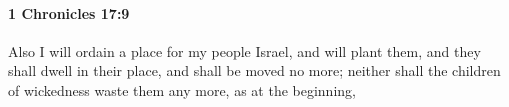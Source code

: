 
		\paragraph{1 Chronicles 17:9} %
			\label{1CHRONICLES-17-9}

			Also I will ordain a place for my people Israel, and will plant them, and they shall dwell in their place, and shall be moved no more; neither shall the children of wickedness waste them any more, as at the beginning,


